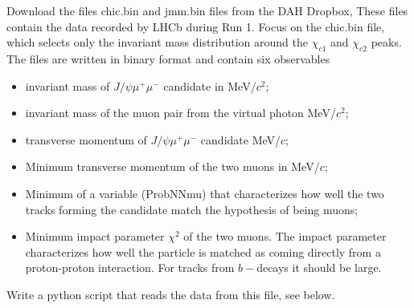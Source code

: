 Download the files chic.bin and jmm.bin files  from the DAH Dropbox, 
These files contain the data recorded by LHCb during Run 1. Focus on the chic.bin file, which selects only the invariant mass distribution around the $\chi_{c1}$ and $\chi_{c2}$ peaks. 
The files are written in binary format and contain six observables
\begin{itemize}
\item  invariant mass of $J/\psi \mu^+ \mu^-$  candidate  in  MeV/$c^2$;
\item  invariant mass of the muon pair from the virtual photon   MeV/$c^2$;
\item transverse momentum of  $J/\psi \mu^+ \mu^-$   candidate  MeV/$c$;
\item Minimum transverse momentum of the two muons in MeV/$c$;
\item Minimum of a variable (ProbNNmu) that characterizes how well the two tracks forming the candidate match the hypothesis of being muons;
\item Minimum impact parameter $\chi^2$ of the two muons. The impact parameter characterizes how well the particle is matched as coming directly from a proton-proton interaction. For tracks from
 $b-$decays it should be large.
\end{itemize}

Write a python script that reads the data from this file, see below. 


